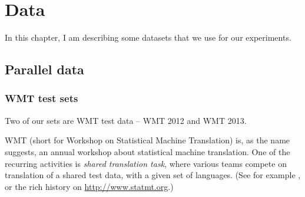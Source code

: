 \chapter{Data}
In this chapter, I am describing some datasets that we use for our experiments.






\section{Parallel data}

\subsection{WMT test sets}
Two of our sets are WMT test data -- WMT 2012 and WMT 2013.

WMT (short for Workshop on Statistical Machine Translation) is, as the name suggests, an annual workshop about statistical machine translation. One of the recurring activities is \emph{shared translation task}, where various teams compete on translation of a shared test data, with a given set of languages. (See for example \cite{wmt_findings_2013}, or the rich history on \url{http://www.statmt.org}.) 


